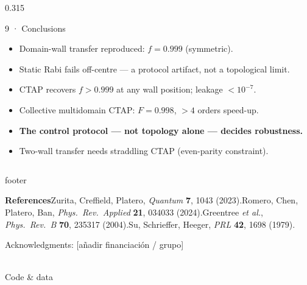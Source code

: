 \documentclass[final]{beamer}
\newlength{\colheight}
\begin{document}
\begin{frame}[t]
\begin{columns}[t,onlytextwidth]
\begin{column}{0.315\textwidth}
\begin{minipage}[t][\colheight][s]{\linewidth}
  \begin{block}{9 · Conclusions}
    \begin{itemize}
      \item Domain-wall transfer reproduced: $f=0.999$ (symmetric).
      \item Static Rabi fails off-centre — a protocol artifact, not a topological limit.
      \item CTAP recovers $f>0.999$ at any wall position; leakage $<10^{-7}$.
      \item Collective multidomain CTAP: $F=0.998$, ${>}4$ orders speed-up.
      \item \textbf{The control protocol — not topology alone — decides robustness.}
      \item Two-wall transfer needs straddling CTAP (even-parity constraint).
    \end{itemize}
  \end{block}

\end{minipage}
\end{column}
\end{columns}

\vspace{0.4cm}

\begin{beamercolorbox}[wd=\textwidth,sep=16pt,rounded=true]{footer}
  \begin{minipage}[c]{0.80\textwidth}
    {\small\textbf{References}\quad
    [9] Zurita, Creffield, Platero, \emph{Quantum} \textbf{7}, 1043 (2023).\quad
    [13] Romero, Chen, Platero, Ban, \emph{Phys.\ Rev.\ Applied} \textbf{21}, 034033 (2024).\quad
    [14] Greentree \emph{et al.}, \emph{Phys.\ Rev.\ B} \textbf{70}, 235317 (2004).\quad
    [6] Su, Schrieffer, Heeger, \emph{PRL} \textbf{42}, 1698 (1979).}
    \par\vspace{6pt}
    {\small Acknowledgments: [añadir financiación / grupo]}
  \end{minipage}\hfill
  \begin{minipage}[c]{0.17\textwidth}
    \centering
    \colorbox{white}{\color{black}}\\[4pt]
    {\small Code \& data}
  \end{minipage}
\end{beamercolorbox}

\end{frame}
\end{document}
